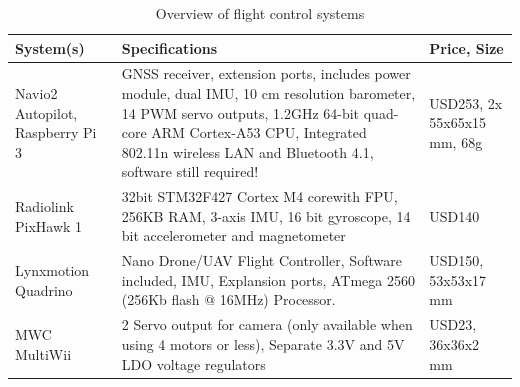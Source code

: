 \begin{table}[h]
    \centering
    \caption{Overview of flight control systems}
    \label{tab:flig_cont}
    \begin{tabularx}{\textwidth}{p{.12\linewidth} L  p{.13\textwidth}  }
    \toprule
\textbf{System(s) }     & \textbf{Specifications }       &\textbf{Price, Size}                                %
\\ \midrule
Navio2 Autopilot, Raspberry Pi 3                       & GNSS receiver, extension ports, includes power module, dual IMU, 10 cm resolution barometer, 14 PWM servo outputs, 1.2GHz 64-bit quad-core ARM Cortex-A53 CPU, Integrated 802.11n wireless LAN and Bluetooth 4.1, software still required!                                                                                                                                                                                                                                                                                  & USD253,   2x   55x65x15 mm, 68g                                  %
\\ \hdashline             
Radiolink PixHawk 1             & 32bit STM32F427 Cortex M4 corewith FPU, 256KB RAM, 3-axis IMU, 16 bit gyroscope, 14 bit accelerometer and magnetometer                             & USD140                                     %
\\ \hdashline
Lynxmotion Quadrino     & Nano Drone/UAV Flight Controller, Software included, IMU, Explansion ports, ATmega 2560 (256Kb flash @ 16MHz) Processor.                                                                 & USD150, 53x53x17 mm                                                                                                                           %
\\ \hdashline 
MWC MultiWii  & 2 Servo output for camera (only available when using 4 motors or less), Separate 3.3V and 5V LDO voltage regulators                                                                                                                                                                                                                                                  & USD23,      36x36x2 mm                                                                                                               %

\end{tabularx}
\end{table}
